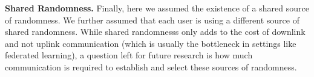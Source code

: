 \noindent\textbf{Shared Randomness.} Finally, here we assumed the existence of a shared source of randomness. We further assumed that each user is using a different source of shared randomness. While shared randomnesss only adds to the cost of downlink and not uplink communication (which is usually the bottleneck in settings like federated learning), a question left for future research is how much communication is required to establish and select these sources of randomness.